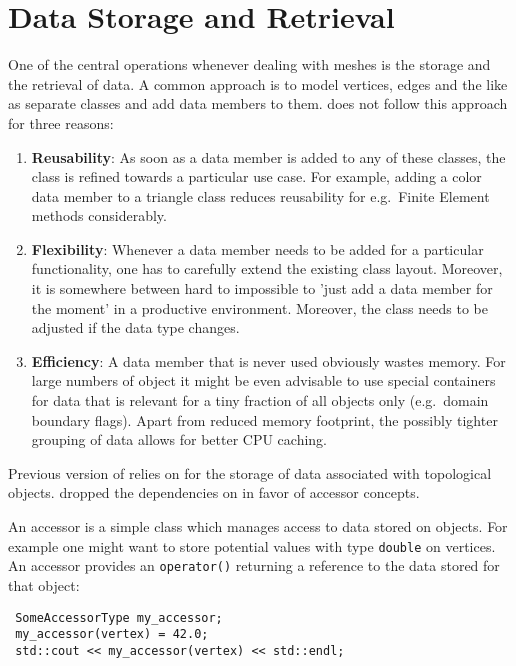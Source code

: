 \chapter{Data Storage and Retrieval} \label{chap:data}

One of the central operations whenever dealing with meshes is the storage and the retrieval of data.
A common approach is to model vertices, edges and the like as separate classes and add data members to them.
{\ViennaGrid} does not follow this approach for three reasons:
\begin{enumerate}
 \item \textbf{Reusability}: As soon as a data member is added to any of these classes, the class is refined towards a particular use case. For example, adding a color data member to a triangle class reduces reusability for e.g.~Finite Element methods considerably.
 \item \textbf{Flexibility}: Whenever a data member needs to be added for a particular functionality, one has to carefully extend the existing class layout. Moreover, it is somewhere between hard to impossible to 'just add a data member for the moment' in a productive environment. Moreover, the class needs to be adjusted if the data type changes.
 \item \textbf{Efficiency}: A data member that is never used obviously wastes memory. For large numbers of object it might be even advisable to use special containers for data that is relevant for a tiny fraction of all objects only (e.g.~domain boundary flags). Apart from reduced memory footprint, the possibly tighter grouping of data allows for better CPU caching. 
\end{enumerate}

Previous version of {\ViennaGrid} relies on {\ViennaData} \cite{ViennaData} for the storage of data associated with topological objects. {\ViennaGridversion} dropped the dependencies on {\ViennaData} in favor of accessor concepts.

An accessor is a simple class which manages access to data stored on objects. For example one might want to store potential values with type \lstinline|double| on vertices. An accessor provides an  \lstinline|operator()| returning a reference to the data stored for that object:

\begin{lstlisting}
 SomeAccessorType my_accessor;
 my_accessor(vertex) = 42.0;
 std::cout << my_accessor(vertex) << std::endl;
\end{lstlisting}

